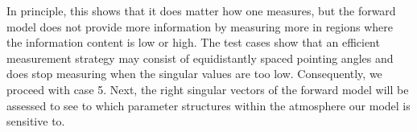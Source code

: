 
In principle, this shows that it does matter how one measures, but the forward model does not provide more information by measuring more in regions where the information content is low or high.
The test cases show that an efficient measurement strategy may consist of equidistantly spaced pointing angles and does stop measuring when the singular values are too low. 
Consequently, we proceed with case 5.
Next, the right singular vectors of the forward model will be assessed to see to which parameter structures within the atmosphere our model is sensitive to.

